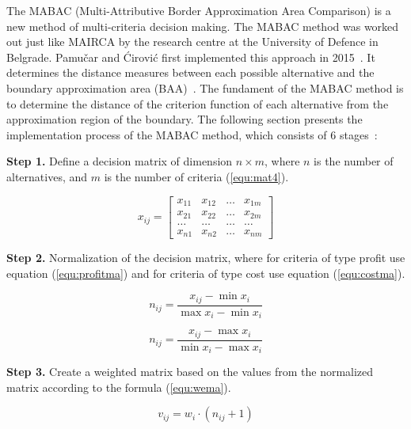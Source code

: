 The MABAC (Multi-Attributive Border Approximation Area Comparison) is a new method of multi-criteria decision making. The MABAC method was worked out just like MAIRCA by the research centre at the University of Defence in Belgrade. Pamučar and Ćirović first implemented this approach in 2015~\cite{mishra2021extended, pamuvcar2015selection}. It determines the distance measures between each possible alternative and the boundary approximation area (BAA)~\cite{wei2019supplier}. The fundament of the MABAC method is to determine the distance of the criterion function of each alternative from the approximation region of the boundary. The following section presents the implementation process of the MABAC method, which consists of 6 stages~\cite{pamuvcar2015selection}:

\noindent \textbf{Step 1.} Define a decision matrix of dimension $n \times m$, where $n$ is the number of alternatives, and $m$ is the number of criteria (\ref{equ:mat4}).

\begin{equation}
\label{equ:mat4}
x_{i j}=\left[\begin{array}{llll}
x_{11} & x_{12} & \ldots & x_{1 m} \\
x_{21} & x_{22} & \ldots & x_{2 m} \\
\ldots & \ldots & \ldots & \ldots \\
x_{n 1} & x_{n 2} & \ldots & x_{n m}
\end{array}\right]
\end{equation}


\noindent \textbf{Step 2.} Normalization of the decision matrix, where for criteria of type profit use equation (\ref{equ:profitma}) and for criteria of type cost use equation (\ref{equ:costma}).

\begin{equation}
\label{equ:profitma}
n_{i j}=\frac{x_{i j}- \min x_{i}}{\max x_{i}- \min x_{i}}
\end{equation}

\begin{equation}
\label{equ:costma}
n_{i j}=\frac{x_{i j}- \max x_{i}}{\min x_{i} - \max x_{i}}
\end{equation}

\noindent \textbf{Step 3.} Create a weighted matrix based on the values from the normalized matrix according to the formula (\ref{equ:wema}).

\begin{equation}
\label{equ:wema}
v_{i j}=w_{i} \cdot\left(n_{i j}+1\right)
\end{equation}


